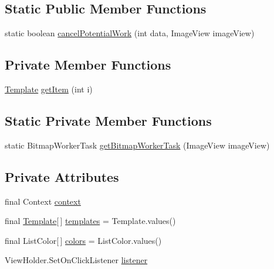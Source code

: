 \subsection*{Static Public Member Functions}
\begin{DoxyCompactItemize}
\item 
static boolean \hyperlink{classorg_1_1buildmlearn_1_1toolkit_1_1adapter_1_1TemplateAdapter_aa314cac047e91a51517a4b68d29b6f39}{cancel\+Potential\+Work} (int data, Image\+View image\+View)
\end{DoxyCompactItemize}
\subsection*{Private Member Functions}
\begin{DoxyCompactItemize}
\item 
\hyperlink{enumorg_1_1buildmlearn_1_1toolkit_1_1model_1_1Template}{Template} \hyperlink{classorg_1_1buildmlearn_1_1toolkit_1_1adapter_1_1TemplateAdapter_a0a369687833d55da928db3df41b65c39}{get\+Item} (int i)
\end{DoxyCompactItemize}
\subsection*{Static Private Member Functions}
\begin{DoxyCompactItemize}
\item 
static Bitmap\+Worker\+Task \hyperlink{classorg_1_1buildmlearn_1_1toolkit_1_1adapter_1_1TemplateAdapter_a9a68de78e39a559725d416a3aa02fc01}{get\+Bitmap\+Worker\+Task} (Image\+View image\+View)
\end{DoxyCompactItemize}
\subsection*{Private Attributes}
\begin{DoxyCompactItemize}
\item 
final Context \hyperlink{classorg_1_1buildmlearn_1_1toolkit_1_1adapter_1_1TemplateAdapter_a848684b0dd6cc43c279f4dde513346ea}{context}
\item 
final \hyperlink{enumorg_1_1buildmlearn_1_1toolkit_1_1model_1_1Template}{Template}\mbox{[}$\,$\mbox{]} \hyperlink{classorg_1_1buildmlearn_1_1toolkit_1_1adapter_1_1TemplateAdapter_ae40d5c4f746400bf9406ae5138a4cdcb}{templates} = Template.\+values()
\item 
final List\+Color\mbox{[}$\,$\mbox{]} \hyperlink{classorg_1_1buildmlearn_1_1toolkit_1_1adapter_1_1TemplateAdapter_ad3708e7103ef3ec7ef5d57edbcd1e9bf}{colors} = List\+Color.\+values()
\item 
View\+Holder.\+Set\+On\+Click\+Listener \hyperlink{classorg_1_1buildmlearn_1_1toolkit_1_1adapter_1_1TemplateAdapter_a7abb2097a4b27a2c6a7ba9630f3b6f64}{listener}
\end{DoxyCompactItemize}


